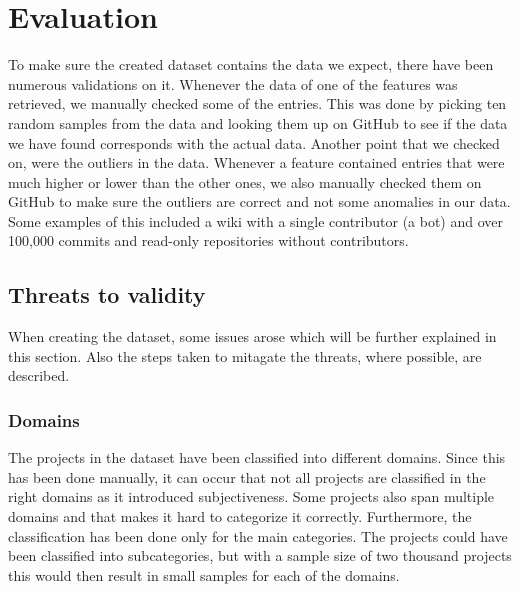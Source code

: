 \section{Evaluation}
To make sure the created dataset contains the data we expect, there have been numerous validations on it.
Whenever the data of one of the features was retrieved, we manually checked some of the entries.
This was done by picking ten random samples from the data and looking them up on GitHub to see if the data we have found corresponds with the actual data.
Another point that we checked on, were the outliers in the data.
Whenever a feature contained entries that were much higher or lower than the other ones, we also manually checked them on GitHub to make sure the outliers are correct and not some anomalies in our data.
Some examples of this included a wiki with a single contributor (a bot) and over 100,000 commits and read-only repositories without contributors. 

\subsection{Threats to validity}
When creating the dataset, some issues arose which will be further explained in this section.
Also the steps taken to mitagate the threats, where possible, are described. \\

\subsubsection{Domains}
The projects in the dataset have been classified into different domains.
Since this has been done manually, it can occur that not all projects are classified in the right domains as it introduced subjectiveness.
Some projects also span multiple domains and that makes it hard to categorize it correctly.
Furthermore, the classification has been done only for the main categories.
The projects could have been classified into subcategories, but with a sample size of two thousand projects this would then result in small samples for each of the domains.
 \\

